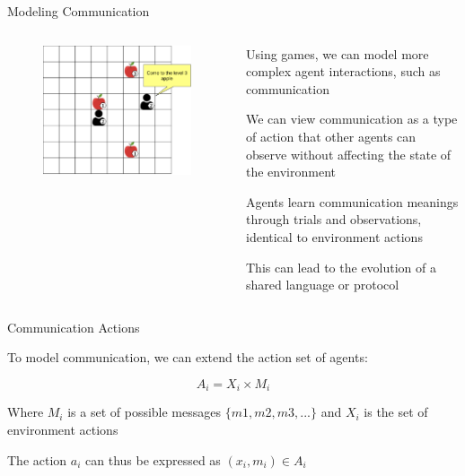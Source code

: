 \begin{frame}{Modeling Communication}

\begin{columns}
\begin{column}{0.4\textwidth}
    \begin{figure}
        \centering
        \includegraphics[width = \linewidth]{images/chapter_3/communication_example.pdf}
    \end{figure}
\end{column} 

\begin{column}{0.6\textwidth}
\blist
    \item Using games, we can model more complex agent interactions, such as communication 
    \item We can view communication as a type of action that other agents can observe without affecting the state of the environment
    \item Agents learn communication meanings through trials and observations, identical to environment actions
    \item This can lead to the evolution of a shared language or protocol
\elist
\end{column}
\end{columns}
\end{frame}

\begin{frame}{Communication Actions}

To model communication, we can extend the action set of agents:

\begin{equation*}
    A_i = X_i \times M_i
\end{equation*}

\blist
    \item Where \(M_i\) is a set of possible messages \(\{m1, m2, m3, ...\}\) and \(X_i\) is the set of environment actions
    \item The action \(a_i\) can thus be expressed as \((x_i, m_i) \in A_i\)
\elist
    
\end{frame}

